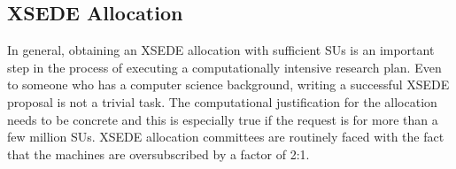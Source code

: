 \documentclass{sig-alternate}
\newcommand{\abhi}[1]{ {\textcolor{red} { ***Abhinav: #1 }}}
\newcommand{\abhi}[1]{ {}}
\begin{document}

%
%

\subsection{XSEDE Allocation}

In general, obtaining an XSEDE allocation with sufficient SUs is an important step in the process of executing
a computationally intensive research plan. Even to someone who has a computer science background, writing a
successful XSEDE proposal is not a trivial task. The computational justification for the allocation needs to
be concrete and this is especially true if the request is for more than a few million SUs. XSEDE
allocation committees are routinely faced with the fact that the machines are oversubscribed by a factor of 2:1.
\end{document}
